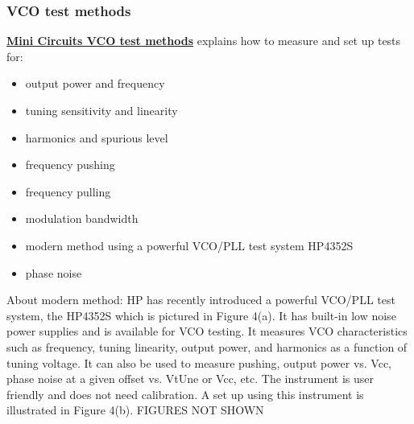 



\subsubsection*{VCO test methods}

\href{https://edisciplinas.usp.br/pluginfile.php/8192379/mod_resource/content/0/VCO-Test_Methods_VCO15-15.pdf}{\textbf{Mini Circuits VCO test methods}} explains how to measure and set up tests for:

\begin{itemize}
	\item output power and frequency
	\item tuning sensitivity and linearity
	\item harmonics and spurious level
	\item frequency pushing
	\item frequency pulling
	\item modulation bandwidth
	\item modern method using a powerful VCO/PLL test system HP4352S
	\item phase noise
\end{itemize}

About modern method: HP has recently introduced a powerful VCO/PLL test system, the HP4352S which is pictured in Figure 4(a). It has built-in low noise power supplies and is available for VCO testing. It measures VCO characteristics such as frequency, tuning linearity, output power, and harmonics as a function of tuning voltage. It can also be used to measure pushing, output power vs. Vcc, phase noise at a given offset vs. VtUne or Vcc, etc. The instrument is user friendly and does not need calibration. A set up using this instrument is illustrated in Figure 4(b). FIGURES NOT SHOWN\\



